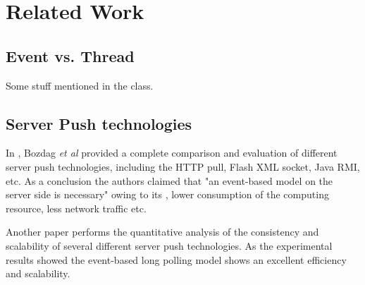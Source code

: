 \section{Related Work\\}

\subsection{Event vs. Thread\\}

Some stuff mentioned in the class.

\subsection{Server Push technologies\\}

In \cite{Engin}, Bozdag \emph{et al} provided a complete comparison 
and evaluation of different server push technologies, including the 
HTTP pull, Flash XML socket, Java RMI, etc. As a conclusion the authors 
claimed that "an event-based model on the server side is necessary" 
owing to its , lower consumption of the computing resource, less network
traffic etc.

Another paper \cite{duquennoy09consistency} performs the quantitative 
analysis of the consistency and scalability of several different server
push technologies. As the experimental results showed the event-based
long polling model shows an excellent efficiency and scalability.

